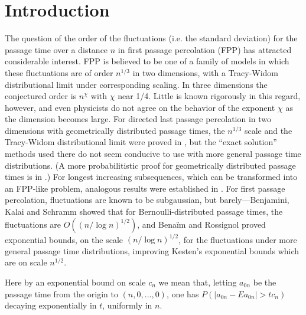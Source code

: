 \documentclass[12pt]{amsart}
\theoremstyle{plain}
\theoremstyle{definition}
\numberwithin{equation}{section}
\begin{document}
\section{Introduction} \label{S:intro}
The question of the order of the fluctuations (i.e. the standard deviation) for the passage time over a distance $n$ in first passage percolation (FPP) has attracted considerable interest.  FPP is believed to be one of a family of models in which these fluctuations are of order $n^{1/3}$ in two dimensions, with a Tracy-Widom distributional limit under corresponding scaling.  In three dimensions the conjectured order is $n^\chi$ with $\chi$ near 1/4.  Little is known rigorously in this regard, however, and even physicists do not agree on the behavior of the exponent $\chi$ as the dimension becomes large.  For directed last passage percolation in two dimensions with geometrically distributed passage times, the $n^{1/3}$ scale and the Tracy-Widom distributional limit were proved in \cite{Jo01}, but the ``exact solution'' methods used there do not seem conducive to use with more general passage time distributions.  (A more probabilitistic proof for geometrically distributed passage times is in \cite{CG06}.)  For longest increasing subsequences, which can be transformed into an FPP-like problem, analogous results were established in \cite{BDJ99}.  For first passage percolation, fluctuations are known to be subgaussian, but barely---Benjamini, Kalai and Schramm \cite{BKS03} showed that for Bernoulli-distributed passage times, the fluctuations are $O((n/\log n)^{1/2})$, and Bena\"im and Rossignol \cite{BR08} proved exponential bounds, on the scale $(n/\log n)^{1/2}$, for the fluctuations under more general passage time distributions, improving Kesten's exponential bounds \cite{Ke93} which are on scale $n^{1/2}$.

Here by an exponential bound on scale $c_n$ we mean that, letting $a_{0n}$ be the passage time from the origin to $(n,0,...,0)$, one has $P(|a_{0n} - Ea_{0n}| > tc_n)$ decaying exponentially in $t$, uniformly in $n$.
\end{document}
